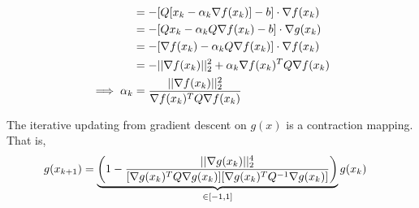 \documentclass{article}
\begin{document}
\begin{lemma}
\begin{align}
			&= - [Q[x_k - \alpha_k \nabla f(x_k)] - b] \cdot \nabla f(x_k) \\
			&= - [Qx_k - \alpha_k Q \nabla f(x_k) - b] \cdot \nabla g(x_k) \\
			&= - [\nabla f(x_k) - \alpha_k Q \nabla f(x_k)] \cdot \nabla f(x_k) \\
			&= - \vert \vert {\nabla f(x_k)} \vert \vert_2^2 + \alpha_k \nabla f(x_k)^T Q \nabla f(x_k) \\
			\implies \alpha_k &= \frac{\vert \vert {\nabla f(x_k)} \vert \vert_2^2}{\nabla f(x_k)^T Q \nabla f(x_k)}
		\end{align}
	\end{lemma}
	
	\begin{lemma}
		The iterative updating from gradient descent on $g(x)$ is a contraction mapping. That is,
		\begin{align}
			g(x_{k+1}) &= \underbrace{\left(1 - \frac{\vert \vert {\nabla g(x_k)} \vert \vert_2^4}{[\nabla g(x_k)^T Q \nabla g(x_k)][\nabla g(x_k)^T Q^{-1} \nabla g(x_k)]} \right)}_{\in [-1, 1]} g(x_k)
		\end{align}
	\end{lemma}
\end{document}
